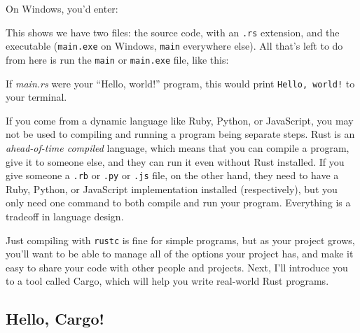 \documentclass[a4paper,]{book}
\newenvironment{Shaded}{\begin{snugshade}}{\end{snugshade}}
\newcommand{\KeywordTok}[1]{\textcolor[rgb]{0.13,0.29,0.53}{\textbf{{#1}}}}
\newcommand{\CommentTok}[1]{\textcolor[rgb]{0.56,0.35,0.01}{\textit{{#1}}}}
\newcommand{\NormalTok}[1]{{#1}}
\begin{document}
\begin{Shaded}
\end{Shaded}

On Windows, you'd enter:

\begin{Shaded}
\end{Shaded}

This shows we have two files: the source code, with an \texttt{.rs}
extension, and the executable (\texttt{main.exe} on Windows,
\texttt{main} everywhere else). All that's left to do from here is run
the \texttt{main} or \texttt{main.exe} file, like this:

\begin{Shaded}
\end{Shaded}

If \emph{main.rs} were your ``Hello, world!'' program, this would print
\texttt{Hello,\ world!} to your terminal.

If you come from a dynamic language like Ruby, Python, or JavaScript,
you may not be used to compiling and running a program being separate
steps. Rust is an \emph{ahead-of-time compiled} language, which means
that you can compile a program, give it to someone else, and they can
run it even without Rust installed. If you give someone a \texttt{.rb}
or \texttt{.py} or \texttt{.js} file, on the other hand, they need to
have a Ruby, Python, or JavaScript implementation installed
(respectively), but you only need one command to both compile and run
your program. Everything is a tradeoff in language design.

Just compiling with \texttt{rustc} is fine for simple programs, but as
your project grows, you'll want to be able to manage all of the options
your project has, and make it easy to share your code with other people
and projects. Next, I'll introduce you to a tool called Cargo, which
will help you write real-world Rust programs.

\hypertarget{hello-cargo}{\subsection{Hello, Cargo!}\label{hello-cargo}}
\end{document}
